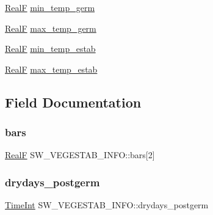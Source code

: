 \begin{DoxyCompactItemize}
\item 
\hyperlink{generic_8h_a94d667c93da0511f21142d988f67674f}{RealF} \hyperlink{struct_s_w___v_e_g_e_s_t_a_b___i_n_f_o_a924385e29e4abeecf6d35323a17ae836}{min\+\_\+temp\+\_\+germ}
\item 
\hyperlink{generic_8h_a94d667c93da0511f21142d988f67674f}{RealF} \hyperlink{struct_s_w___v_e_g_e_s_t_a_b___i_n_f_o_aee936f02dc75c6c3483f628222a79f80}{max\+\_\+temp\+\_\+germ}
\item 
\hyperlink{generic_8h_a94d667c93da0511f21142d988f67674f}{RealF} \hyperlink{struct_s_w___v_e_g_e_s_t_a_b___i_n_f_o_a84b614fda58754c15cc8b015717fd83c}{min\+\_\+temp\+\_\+estab}
\item 
\hyperlink{generic_8h_a94d667c93da0511f21142d988f67674f}{RealF} \hyperlink{struct_s_w___v_e_g_e_s_t_a_b___i_n_f_o_a88e075e6b30eae80f761ef71659c1383}{max\+\_\+temp\+\_\+estab}
\end{DoxyCompactItemize}


\subsection{Field Documentation}
\mbox{\label{struct_s_w___v_e_g_e_s_t_a_b___i_n_f_o_a912efd96100f0924d71682579e2087eb}} 
\subsubsection{\texorpdfstring{bars}{bars}}
{\footnotesize\ttfamily \hyperlink{generic_8h_a94d667c93da0511f21142d988f67674f}{RealF} S\+W\+\_\+\+V\+E\+G\+E\+S\+T\+A\+B\+\_\+\+I\+N\+F\+O\+::bars\mbox{[}2\mbox{]}}

\mbox{\label{struct_s_w___v_e_g_e_s_t_a_b___i_n_f_o_a55d3c45fb5b1cf57d46dd685c52a0470}} 
\subsubsection{\texorpdfstring{drydays\+\_\+postgerm}{drydays\_postgerm}}
{\footnotesize\ttfamily \hyperlink{_times_8h_a25ac787161a5cad0e3fdfe5a5aeb3236}{Time\+Int} S\+W\+\_\+\+V\+E\+G\+E\+S\+T\+A\+B\+\_\+\+I\+N\+F\+O\+::drydays\+\_\+postgerm}

